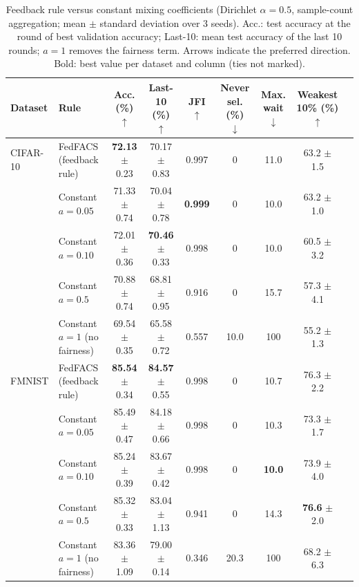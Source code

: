 \begin{table}[!htbp]
\centering
\footnotesize
\setlength{\tabcolsep}{2.5pt}
\renewcommand{\arraystretch}{1.08}
\caption{Feedback rule versus constant mixing coefficients (Dirichlet $\alpha=0.5$, sample-count aggregation; mean $\pm$ standard deviation over 3 seeds). Acc.: test accuracy at the round of best validation accuracy; Last-10: mean test accuracy of the last 10 rounds; $a=1$ removes the fairness term. Arrows indicate the preferred direction. Bold: best value per dataset and column (ties not marked).}
\label{tab:mixing}
\begin{tabular*}{\journalfloatwidth}{@{\extracolsep{\fill}}llccccccc@{}}
\toprule
Dataset & Rule & Acc. (\%) $\uparrow$ & Last-10 (\%) $\uparrow$ & JFI $\uparrow$ & Never sel. (\%) $\downarrow$ & Max. wait $\downarrow$ & Weakest 10\% (\%) $\uparrow$ \\
\midrule
CIFAR-10 & FedFACS (feedback rule) & \textbf{72.13} $\pm$ 0.23 & 70.17 $\pm$ 0.83 & 0.997 & 0 & 11.0 & 63.2 $\pm$ 1.5 \\
         & Constant $a=0.05$       & 71.33 $\pm$ 0.74 & 70.04 $\pm$ 0.78 & \textbf{0.999} & 0 & 10.0 & 63.2 $\pm$ 1.0 \\
         & Constant $a=0.10$       & 72.01 $\pm$ 0.36 & \textbf{70.46} $\pm$ 0.33 & 0.998 & 0 & 10.0 & 60.5 $\pm$ 3.2 \\
         & Constant $a=0.5$        & 70.88 $\pm$ 0.74 & 68.81 $\pm$ 0.95 & 0.916 & 0 & 15.7 & 57.3 $\pm$ 4.1 \\
         & Constant $a=1$ (no fairness) & 69.54 $\pm$ 0.35 & 65.58 $\pm$ 0.72 & 0.557 & 10.0 & 100 & 55.2 $\pm$ 1.3 \\
\midrule
FMNIST   & FedFACS (feedback rule) & \textbf{85.54} $\pm$ 0.34 & \textbf{84.57} $\pm$ 0.55 & 0.998 & 0 & 10.7 & 76.3 $\pm$ 2.2 \\
         & Constant $a=0.05$       & 85.49 $\pm$ 0.47 & 84.18 $\pm$ 0.66 & 0.998 & 0 & 10.3 & 73.3 $\pm$ 1.7 \\
         & Constant $a=0.10$       & 85.24 $\pm$ 0.39 & 83.67 $\pm$ 0.42 & 0.998 & 0 & \textbf{10.0} & 73.9 $\pm$ 4.0 \\
         & Constant $a=0.5$        & 85.32 $\pm$ 0.33 & 83.04 $\pm$ 1.13 & 0.941 & 0 & 14.3 & \textbf{76.6} $\pm$ 2.0 \\
         & Constant $a=1$ (no fairness) & 83.36 $\pm$ 1.09 & 79.00 $\pm$ 0.14 & 0.346 & 20.3 & 100 & 68.2 $\pm$ 6.3 \\
\bottomrule
\end{tabular*}
\end{table}

